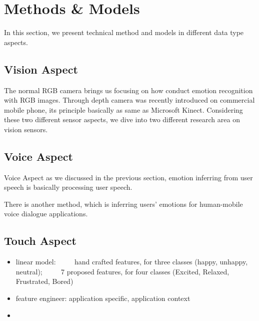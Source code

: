 \section{Methods \& Models}\label{sec:methods}

In this section, we present technical method and models in different data type aspects.

\subsection{Vision Aspect} \label{subsec:vision-model}

The normal RGB camera brings us focusing on how conduct emotion recognition with RGB images. Through depth camera was recently introduced on commercial mobile phone, its principle basically as same as Microsoft Kinect. Considering these two different sensor aspects, we dive into two different research area on vision sensors.



\cite{Mollahosseini2017}

\subsection{Voice Aspect}\label{subsec:voice-model}

Voice Aspect as we discussed in the previous section, emotion inferring from user speech is basically
processing user speech.

There is another method, which is inferring users' emotions for human-mobile voice dialogue applications.

\subsection{Touch Aspect}\label{subsec:touch-model}

\begin{itemize}
  \item linear model:
~~~~\cite{Shah2015} hand crafted features, for three classes (happy, unhappy, neutral); 
~~~~\cite{bhattacharya2017predictive} 7 proposed features, for four classes (Excited, Relaxed, Frustrated, Bored)

  \item feature engineer: \cite{Gao2012} application specific, application context
  \item 
\end{itemize}


